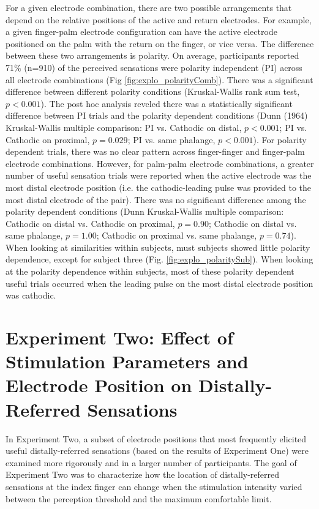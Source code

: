 \documentclass[10pt]{iopart}
\begin{document}
For a given electrode combination, there are two possible arrangements  that depend on the relative positions of the active and return electrodes. For example, a given finger-palm electrode configuration can have the active electrode positioned on the palm with the return on the finger, or vice versa. The difference between these two arrangements is polarity. On average, participants reported 71\% (n=910) of the perceived sensations were polarity independent (PI) across all electrode combinations (Fig \ref{fig:explo_polarityComb}). There was a significant difference between different polarity conditions (Kruskal-Wallis rank sum test, $p<0.001$). The post hoc analysis reveled there was a statistically significant difference between PI trials and the polarity dependent conditions (Dunn (1964) Kruskal-Wallis multiple comparison: PI vs. Cathodic on distal, $p<0.001$; PI vs. Cathodic on proximal, $p=0.029$; PI vs. same phalange, $p<0.001$). For polarity dependent trials, there was no clear pattern across finger-finger and finger-palm electrode combinations. However, for palm-palm electrode combinations, a greater number of useful sensation trials were reported when the active electrode was the most distal electrode position (i.e. the cathodic-leading pulse was provided to the most distal electrode of the pair). There was no significant difference among the polarity dependent conditions (Dunn Kruskal-Wallis multiple comparison: Cathodic on distal vs. Cathodic on proximal, $p=0.90$; Cathodic on distal vs. same phalange, $p=1.00$; Cathodic on proximal vs. same phalange, $p=0.74$). When looking at similarities within subjects, must subjects showed little polarity dependence, except for subject three (Fig. \ref{fig:explo_polaritySub}). When looking at the polarity dependence within subjects, most of these polarity dependent useful trials occurred when the leading pulse on the most distal electrode position was cathodic.

\section{Experiment Two: Effect of Stimulation Parameters and Electrode Position on Distally-Referred Sensations}

In Experiment Two, a subset of electrode positions that most frequently elicited useful distally-referred sensations (based on the results of Experiment One) were examined more rigorously and in a larger number of participants. The goal of Experiment Two was to characterize how the location of distally-referred sensations at the index finger can change when the stimulation intensity varied between the perception threshold and the maximum comfortable limit.
\end{document}
